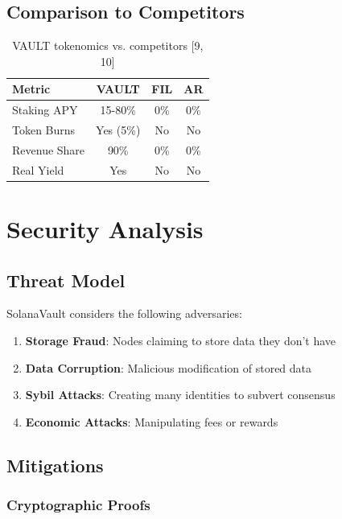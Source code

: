 \documentclass[12pt,a4paper]{article}
\begin{document}
\subsection{Comparison to Competitors}

\begin{table}[h]
\centering
\begin{tabular}{@{}lccc@{}}
\toprule
\textbf{Metric} & \textbf{VAULT} & \textbf{FIL} & \textbf{AR} \\
\midrule
Staking APY & 15-80\% & 0\% & 0\% \\
Token Burns & Yes (5\%) & No & No \\
Revenue Share & 90\% & 0\% & 0\% \\
Real Yield & Yes & No & No \\
\bottomrule
\end{tabular}
\caption{VAULT tokenomics vs. competitors [9, 10]}
\end{table}

\section{Security Analysis}

\subsection{Threat Model}

SolanaVault considers the following adversaries:

\begin{enumerate}
    \item \textbf{Storage Fraud}: Nodes claiming to store data they don't have
    \item \textbf{Data Corruption}: Malicious modification of stored data
    \item \textbf{Sybil Attacks}: Creating many identities to subvert consensus
    \item \textbf{Economic Attacks}: Manipulating fees or rewards
\end{enumerate}

\subsection{Mitigations}

\subsubsection{Cryptographic Proofs}
\end{document}
